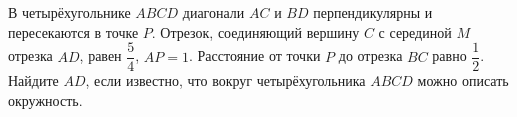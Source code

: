 \begin{ex}
	\begin{condition}
		В четырёхугольнике \( ABCD  \) диагонали \( AC \) и \( BD  \) перпендикулярны и пересекаются в точке \( P \). Отрезок, соединяющий вершину \( C \) с серединой \( M  \) отрезка \( AD \), равен \( \dfrac{5}{4} \), \( AP=1 \). Расстояние от точки \( P  \) до	отрезка \( BC  \) равно	\( \dfrac{1}{2} \). Найдите \( AD \), если известно, что вокруг четырёхугольника \( ABCD  \) можно описать окружность.
	\end{condition}
\end{ex}